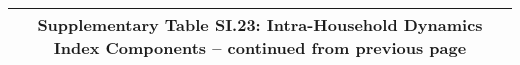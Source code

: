 \begin{longtable}{llcccccccccc}
\multicolumn{12}{c}{{\bfseries Supplementary Table SI.23: Intra-Household Dynamics Index Components -- continued from previous page}} \\ \hline                                                                                                                                                                                                                                                                                                                                                                                                                                                                                                                                                                                                                                                                                                                                           

\end{longtable}

